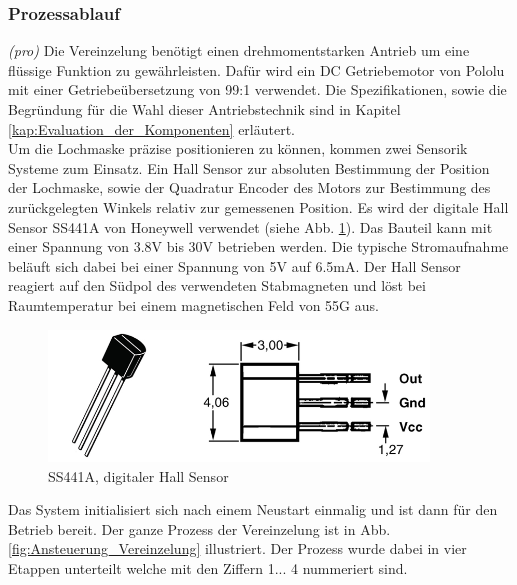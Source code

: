 \subsubsection{Prozessablauf}
\textit{(pro)} Die Vereinzelung benötigt einen drehmomentstarken Antrieb um eine flüssige Funktion zu gewährleisten. Dafür wird ein DC Getriebemotor von Pololu mit einer Getriebeübersetzung von 99:1 verwendet. Die Spezifikationen, sowie die Begründung für die Wahl dieser Antriebstechnik sind in Kapitel \ref{kap:Evaluation_der_Komponenten} erläutert.
\\ Um die Lochmaske präzise positionieren zu können, kommen zwei Sensorik Systeme zum Einsatz. Ein Hall Sensor zur absoluten Bestimmung der Position der Lochmaske, sowie der Quadratur Encoder des Motors zur Bestimmung des zurückgelegten Winkels relativ zur gemessenen Position. Es wird der digitale Hall Sensor SS441A von Honeywell verwendet (siehe Abb. \ref{fig:SS441A}). Das Bauteil kann mit einer Spannung von 3.8V bis 30V betrieben werden. Die typische Stromaufnahme beläuft sich dabei bei einer Spannung von 5V auf 6.5mA. Der Hall Sensor reagiert auf den Südpol des verwendeten Stabmagneten und löst bei Raumtemperatur bei einem magnetischen Feld von 55G aus.

\begin{figure}[H]
	\includegraphics[width=0.9\textwidth]{Illustrationen/6-Umsetzung/Hall_Sensor.png}
	\caption{SS441A, digitaler Hall Sensor \protect\cite{SS441A}}
	\label{fig:SS441A}
\end{figure}

Das System initialisiert sich nach einem Neustart einmalig und ist dann für den Betrieb bereit. Der ganze Prozess der Vereinzelung ist in Abb. \ref{fig:Ansteuerung_Vereinzelung} illustriert.  Der Prozess wurde dabei in vier Etappen unterteilt welche mit den Ziffern 1... 4 nummeriert sind.

